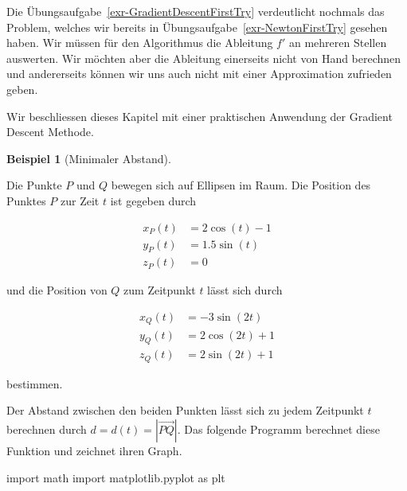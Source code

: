 \documentclass[
  a4paper,
  DIV=11]{scrreprt}
\newenvironment{Shaded}{\begin{snugshade}}{\end{snugshade}}
\newcommand{\ImportTok}[1]{\textcolor[rgb]{0.00,0.46,0.62}{#1}}
\newcommand{\NormalTok}[1]{\textcolor[rgb]{0.00,0.23,0.31}{#1}}
\theoremstyle{definition}
\theoremstyle{definition}
\newtheorem{example}{Beispiel}[chapter]
\theoremstyle{remark}
\begin{document}
Die Übungsaufgabe~\ref{exr-GradientDescentFirstTry} verdeutlicht
nochmals das Problem, welches wir bereits in
Übungsaufgabe~\ref{exr-NewtonFirstTry} gesehen haben. Wir müssen für den
Algorithmus die Ableitung \(f'\) an mehreren Stellen auswerten. Wir
möchten aber die Ableitung einerseits nicht von Hand berechnen und
andererseits können wir uns auch nicht mit einer Approximation zufrieden
geben.

Wir beschliessen dieses Kapitel mit einer praktischen Anwendung der
Gradient Descent Methode.

\begin{example}[Minimaler
Abstand]\protect\hypertarget{exm-GDApplication}{}\label{exm-GDApplication}

Die Punkte \(P\) und \(Q\) bewegen sich auf Ellipsen im Raum. Die
Position des Punktes \(P\) zur Zeit \(t\) ist gegeben durch

\begin{align*}
    x_P(t) &= 2 \cos(t) - 1 \\
    y_P(t) &= 1.5 \sin(t)   \\
    z_P(t) &= 0             
\end{align*}

und die Position von \(Q\) zum Zeitpunkt \(t\) lässt sich durch

\begin{align*}
    x_Q(t) &= -3 \sin(2t)     \\
    y_Q(t) &= 2 \cos(2t) + 1  \\
    z_Q(t) &= 2 \sin(2t) + 1  
\end{align*}

bestimmen.

Der Abstand zwischen den beiden Punkten lässt sich zu jedem Zeitpunkt
\(t\) berechnen durch \(d = d(t) = |\overrightarrow{PQ}|\). Das folgende
Programm berechnet diese Funktion und zeichnet ihren Graph.

\begin{Shaded}
\begin{Highlighting}[]
\ImportTok{import}\NormalTok{ math}
\ImportTok{import}\NormalTok{ matplotlib.pyplot }\ImportTok{as}\NormalTok{ plt}


\end{Highlighting}
\end{Shaded}
\end{example}
\end{document}
